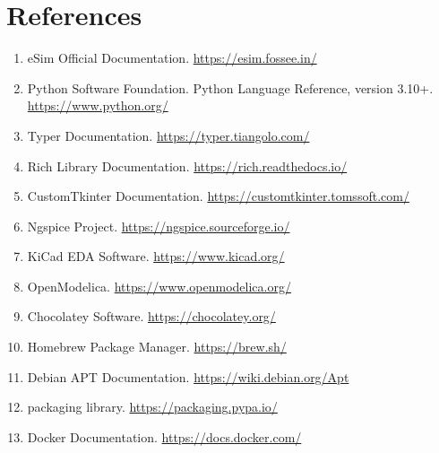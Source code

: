 \documentclass[12pt,a4paper]{report}
\begin{document}
\chapter{References}
\begin{enumerate}
    \item eSim Official Documentation. \url{https://esim.fossee.in/}
    \item Python Software Foundation. Python Language Reference, version 3.10+. \url{https://www.python.org/}
    \item Typer Documentation. \url{https://typer.tiangolo.com/}
    \item Rich Library Documentation. \url{https://rich.readthedocs.io/}
    \item CustomTkinter Documentation. \url{https://customtkinter.tomssoft.com/}
    \item Ngspice Project. \url{https://ngspice.sourceforge.io/}
    \item KiCad EDA Software. \url{https://www.kicad.org/}
    \item OpenModelica. \url{https://www.openmodelica.org/}
    \item Chocolatey Software. \url{https://chocolatey.org/}
    \item Homebrew Package Manager. \url{https://brew.sh/}
    \item Debian APT Documentation. \url{https://wiki.debian.org/Apt}
    \item packaging library. \url{https://packaging.pypa.io/}
    \item Docker Documentation. \url{https://docs.docker.com/}
\end{enumerate}
\end{document}
